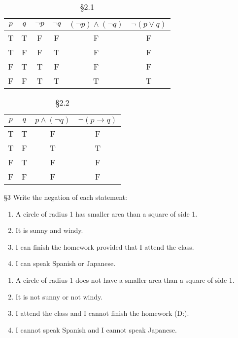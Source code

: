 \documentclass{homework}
\begin{document}
\begin{solution}
  \begin{table}[htpb]
    \centering
    \caption{\S 2.1}
    \begin{tabular}{c|c|c|c|c|c}
      $p$ & $q$ & $\neg p$ & $\neg q$ & $\left( \neg p \right) \land \left( \neg q \right) $ &
      $\neg \left( p \lor q \right) $ \\
      \toprule
      \bottomrule
      T & T & F & F & F & F \\
      T & F & F & T & F & F \\
      F & T & T & F & F & F \\
      F & F & T & T & T & T 
    \end{tabular}
  \end{table}

  \begin{table}[htpb]
    \centering
    \caption{\S 2.2}
    \begin{tabular}{c|c|c|c}
      $p$ & $q$ & $p \land \left( \neg q \right) $ & $\neg\left( p \to q \right) $ \\
      \toprule
      \bottomrule 
      T & T & F & F \\
      T & F & T & T \\
      F & T & F & F \\
      F & F & F & F \\
    \end{tabular}
  \end{table}
\end{solution}

\begin{problem}{\S 3}
  Write the negation of each statement:
  \begin{enumerate}[label=(\alph*)]
    \item A circle of radius 1 has smaller area than a square of side 1.
    \item It is sunny and windy.
    \item I can finish the homework provided that I attend the class.
    \item I can speak Spanish or Japanese.
  \end{enumerate}
\end{problem}

\begin{solution}
\begin{enumerate}[label=(\alph*)]
  \item A circle of radius 1 does not have a smaller area than a square of side 1.
  \item It is not sunny or not windy.
  \item I attend the class and I cannot finish the homework (D:).
  \item I cannot speak Spanish and I cannot speak Japanese.
\end{enumerate}
\end{solution}
\end{document}
